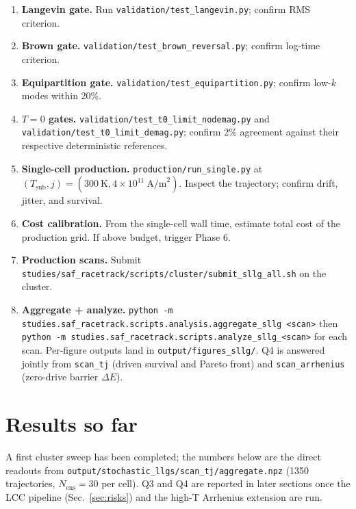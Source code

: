 \documentclass[11pt,a4paper]{article}
\newcommand{\jcur}{j}
\begin{document}
\begin{enumerate}[leftmargin=2em]
    \item \textbf{Langevin gate.} Run
    \texttt{validation/test\_langevin.py}; confirm RMS criterion.
    \item \textbf{Brown gate.}
    \texttt{validation/test\_brown\_reversal.py};
    confirm log-time criterion.
    \item \textbf{Equipartition gate.}
    \texttt{validation/test\_equipartition.py};
    confirm low-$k$ modes within 20\%.
    \item \textbf{$T=0$ gates.}
    \texttt{validation/test\_t0\_limit\_nodemag.py} and
    \texttt{validation/test\_t0\_limit\_demag.py}; confirm 2\%
    agreement against their respective deterministic references.
    \item \textbf{Single-cell production.}
    \texttt{production/run\_single.py} at $(T_{\text{sub}}, \jcur) =
    (300~\text{K}, 4\times 10^{11}~\text{A/m}^2)$. Inspect the
    trajectory; confirm drift, jitter, and survival.
    \item \textbf{Cost calibration.} From the single-cell wall time,
    estimate total cost of the production grid. If above budget,
    trigger Phase 6.
    \item \textbf{Production scans.} Submit
    \texttt{studies/saf\_racetrack/scripts/cluster/submit\_sllg\_all.sh} on the cluster.
    \item \textbf{Aggregate + analyze.}
    \texttt{python -m studies.saf\_racetrack.scripts.analysis.aggregate\_sllg <scan>} then
    \texttt{python -m studies.saf\_racetrack.scripts.analyze\_sllg\_<scan>} for each scan.
    Per-figure outputs land in \texttt{output/figures\_sllg/}.
    Q4 is answered jointly from \texttt{scan\_tj} (driven survival
    and Pareto front) and \texttt{scan\_arrhenius} (zero-drive
    barrier $\Delta E$).
\end{enumerate}

\section{Results so far}\label{sec:results}

A first cluster sweep has been completed; the numbers below are the
direct readouts from
\texttt{output/stochastic\_llgs/scan\_tj/aggregate.npz} (1350
trajectories, $N_\mathrm{ens}=30$ per cell). Q3 and Q4 are reported in
later sections once the LCC pipeline (Sec.~\ref{sec:risks}) and the
high-T Arrhenius extension are run.
\end{document}
